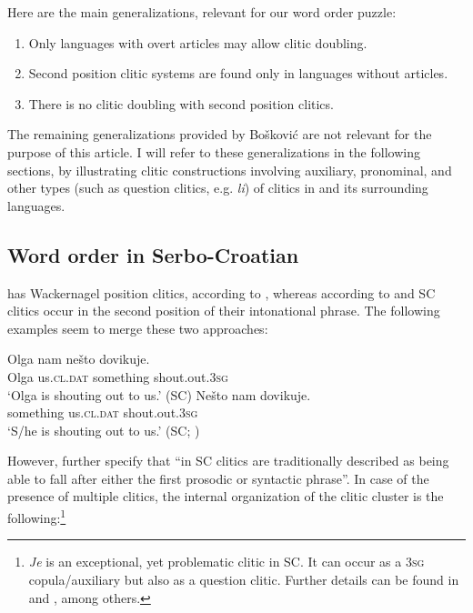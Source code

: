 \documentclass[output=paper,
colorlinks,
citecolor=brown,
newtxmath
]{langscibook}
\begin{document}
Here are the main generalizations, relevant for our word order puzzle:
\begin{enumerate}
\item Only languages with overt articles may allow clitic doubling.\label{gen:1}
\item Second position clitic systems are found only in languages without articles.\label{gen:2}
\item There is no clitic doubling with second position clitics.\label{gen:3}
\end{enumerate}

\noindent The remaining generalizations provided by Bošković are not relevant for the purpose of this article.
I will refer to these generalizations in the following sections, by illustrating clitic constructions involving auxiliary, pronominal, and other types (such as question clitics, e.g. \textit{li}) of clitics in  and its surrounding languages.

\subsection{Word order in Serbo-Croatian}
\label{subsec:orderSC}
 has Wackernagel position clitics, according to \citet[217]{Franks.King2000}, whereas according to \citet{Boskovic2001} and \citet{Radanovic-Kocic1988,Radanovic-Kocic1996} SC clitics occur in the second position of their intonational phrase. The following examples seem to merge these two approaches:


\ea\label{ex:zivojinovic:17}
\gll Olga nam        nešto     dovikuje.\\
     Olga us.\textsc{cl.dat}  something shout.out.\textsc{3sg}\\
\glt `Olga is shouting out to us.'
\hfill (SC)
\ex\label{ex:zivojinovic:18}
\gll Nešto     nam       dovikuje.\\
     something us.\textsc{cl.dat} shout.out.\textsc{3sg}\\
\glt `S/he is shouting out to us.'
\hfill (SC; \citealt[105]{Radanovic-Kocic1988})
\z

\noindent However, \citet[219]{Franks.King2000} further specify that ``in SC clitics are traditionally described as being able to fall after either the first prosodic or syntactic phrase''. In case of the presence of multiple clitics, the internal organization of the clitic cluster is the following:\footnote{\textit{Je} is an exceptional, yet problematic clitic in SC. It can occur as a \textsc{3sg} copula/auxiliary but also as a question clitic. Further details can be found in \citet{Franks2017} and \citet{Zivojinovicinpreparation}, among others.}
\end{document}
